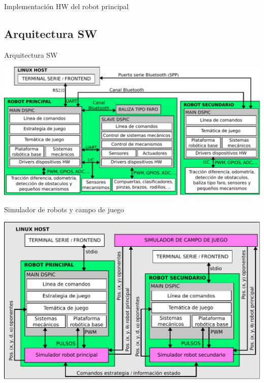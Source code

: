 \documentclass{beamer}
\begin{document}
\begin{frame}{Implementación HW del robot principal}
\begin{center}
\end{center}
\end{frame}


\subsection{Arquitectura SW}

\begin{frame}{Arquitectura SW}
\begin{center}
\includegraphics[width=\textwidth]{sw_diagrama_bloques}
\end{center}
\end{frame}

\begin{frame}{Simulador de robots y campo de juego}
\begin{center}
\includegraphics[width=.9\textwidth]{sw_diagrama_bloques_simulador}
\end{center}
\end{frame}
\end{document}
